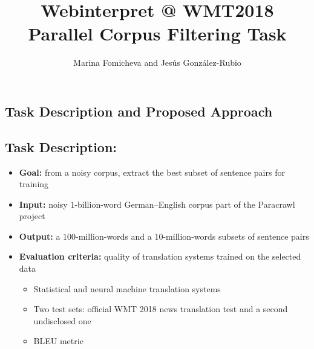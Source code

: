 \documentclass[a0]{sciposter}
\title{Webinterpret @ WMT2018\\Parallel Corpus Filtering Task}
\author{Marina Fomicheva and Jes\'{u}s Gonz\'{a}lez-Rubio}
\institute{AT Language Solutions$^*$ and Webinterpret\\\vspace*{-.45em}{\footnotesize $^*$Marina Fomicheva worked at Webinterpret at the time of preparation of this submission.}}
\begin{document}
\maketitle

\begin{multicols*}{2}



\section*{\Large Task Description and Proposed Approach}

\subsection*{Task Description:}
\begin{itemize}
  \item {\bf Goal:} from a noisy corpus, extract the best subset of sentence pairs for training
  \item {\bf Input:} noisy $1$-billion-word German--English corpus part of the Paracrawl project %
  \item {\bf Output:} a $100$-million-words and a $10$-million-words subsets of sentence pairs
  \item {\bf Evaluation criteria:} quality of translation systems trained on the selected data
  \begin{itemize}
    \item Statistical and neural machine translation systems
    \item Two test sets: official WMT 2018 news translation test and a second undisclosed one
    \item BLEU metric
  \end{itemize}
\end{itemize}


\end{multicols*}
\end{document}
